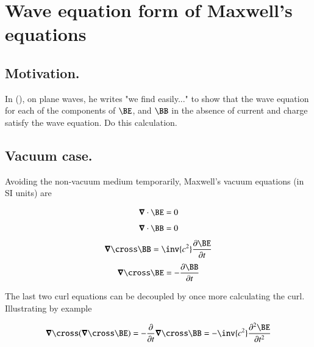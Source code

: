 %

\chapter{Wave equation form of Maxwell's equations}\label{chap:emVacWave}
\date{ June 21, 2009.  $RCSfile: emVacWave.tex,v $ Last $Revision: 1.5 $ $Date: 2009/07/11 05:49:02 $ }

\beginArtWithToc

\section{Motivation.}

In (\cite{jackson1975cew}), on plane waves, he writes "we find easily..." to show that the wave equation for each of the components of $\BE$, and $\BB$ in the absence of current and charge satisfy the wave equation.  Do this calculation.

\section{Vacuum case.}

Avoiding the non-vacuum medium temporarily, Maxwell's vacuum equations (in SI units) are

\begin{align}\label{eqn:emVacWave:divE}
\spacegrad \cdot \BE = 0
\end{align}
\begin{align}\label{eqn:emVacWave:divB}
\spacegrad \cdot \BB = 0
\end{align}
\begin{align}\label{eqn:emVacWave:curlB}
\spacegrad \cross \BB = \inv{c^2} \frac{\partial \BE}{\partial t}
\end{align}
\begin{align}\label{eqn:emVacWave:curlE}
\spacegrad \cross \BE = -\frac{\partial \BB}{\partial t}
\end{align}

The last two curl equations can be decoupled by once more calculating the curl.  Illustrating by example

\begin{align}\label{eqn:emVacWave:curlCurlE}
\spacegrad \cross (\spacegrad \cross \BE) = -\frac{\partial }{\partial t} \spacegrad \cross \BB = -\inv{c^2} \frac{\partial^2 \BE}{\partial t^2}
\end{align}

